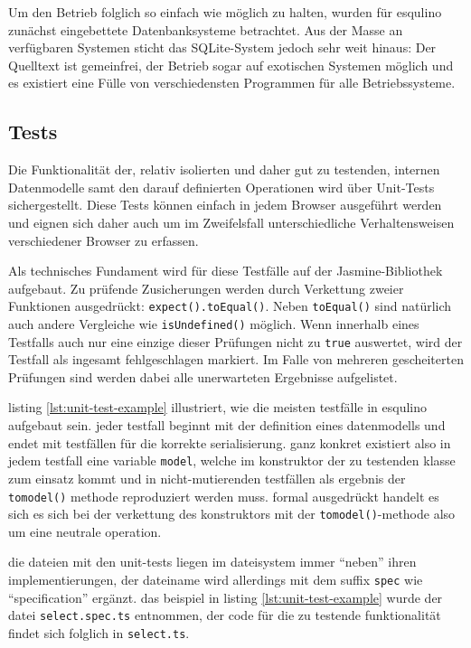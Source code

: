 Um den Betrieb folglich so einfach wie möglich zu halten, wurden für esqulino zunächst eingebettete Datenbanksysteme betrachtet. Aus der Masse an verfügbaren Systemen sticht das SQLite-System jedoch sehr weit hinaus: Der Quelltext ist gemeinfrei, der Betrieb sogar auf exotischen Systemen möglich und es existiert eine Fülle von verschiedensten Programmen für alle Betriebssysteme.


\subsection{Tests}

Die Funktionalität der, relativ isolierten und daher gut zu testenden, internen Datenmodelle samt den darauf definierten Operationen wird über Unit-Tests sichergestellt. Diese Tests können einfach in jedem Browser ausgeführt werden und eignen sich daher auch um im Zweifelsfall unterschiedliche Verhaltensweisen verschiedener Browser zu erfassen.

Als technisches Fundament wird für diese Testfälle auf der Jasmine-Bibliothek aufgebaut. Zu prüfende Zusicherungen werden durch Verkettung zweier Funktionen ausgedrückt: \lstinline{expect().toEqual()}. Neben \lstinline{toEqual()} sind natürlich auch andere Vergleiche wie \lstinline{isUndefined()} möglich. Wenn innerhalb eines Testfalls auch nur eine einzige dieser Prüfungen nicht zu \lstinline{true} auswertet, wird der Testfall als ingesamt fehlgeschlagen markiert. Im Falle von mehreren gescheiterten Prüfungen sind werden dabei alle unerwarteten Ergebnisse aufgelistet.

listing \ref{lst:unit-test-example} illustriert, wie die meisten testfälle in esqulino aufgebaut sein. jeder testfall beginnt mit der definition eines datenmodells und endet mit testfällen für die korrekte serialisierung. ganz konkret existiert also in jedem testfall eine variable \lstinline{model}, welche im konstruktor der zu testenden klasse zum einsatz kommt und in nicht-mutierenden testfällen als ergebnis der \lstinline{tomodel()} methode reproduziert werden muss. formal ausgedrückt handelt es sich es sich bei der verkettung des konstruktors mit der \lstinline{tomodel()}-methode also um eine neutrale operation.

die dateien mit den unit-tests liegen im dateisystem immer "`neben"' ihren implementierungen, der dateiname wird allerdings mit dem suffix \lstinline{spec} wie "`specification"' ergänzt. das beispiel in listing  \ref{lst:unit-test-example} wurde der datei \lstinline{select.spec.ts} entnommen, der code für die zu testende funktionalität findet sich folglich in \lstinline{select.ts}.

